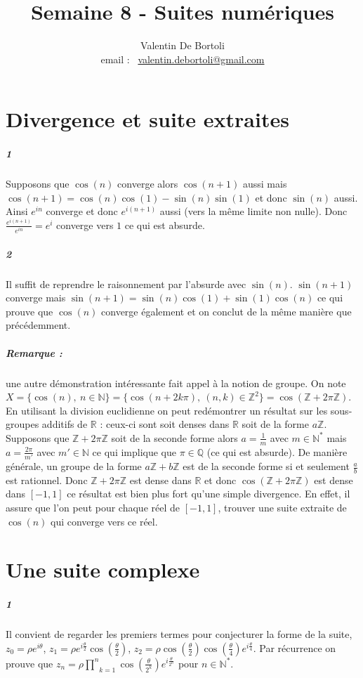 \documentclass[10pt,a4paper]{article}
\title{Semaine 8 - Suites numériques}
\author{Valentin De Bortoli \\ email : \ \href{mailto:valentin.debortoli@gmail.com}{valentin.debortoli@gmail.com}}
\date{}
\newcommand{\prodd}[2]{\underset{#1}{\overset{#2}{\prod}}}
\begin{document}
\maketitle
\section{Divergence et suite extraites}

\subparagraph{1}Supposons que $\cos(n)$ converge alors $\cos(n+1)$ aussi mais $\cos(n+1) = \cos(n)\cos(1) - \sin(n)\sin(1)$ et donc $\sin(n)$ aussi. Ainsi $e^{in}$ converge et donc $e^{i(n+1)}$ aussi (vers la même limite non nulle). Donc $\frac{e^{i(n+1)}}{e^{in}} = e^i$ converge vers $1$ ce qui est absurde.

\subparagraph{2}Il suffit de reprendre le raisonnement par l'absurde avec $\sin(n)$. $\sin(n+1)$ converge mais $\sin(n+1) = \sin(n)\cos(1) + \sin(1)\cos(n)$ ce qui prouve que $\cos(n)$ converge également et on conclut de la même manière que précédemment.

\subparagraph{Remarque :} une autre démonstration intéressante fait appel à la notion de groupe. On note $X= \lbrace \cos(n), \ n\in \mathbb{N} \rbrace = \lbrace \cos(n + 2k\pi) , \ (n,k) \in \mathbb{Z}^2 \rbrace = \cos \left( \mathbb{Z} + 2\pi \mathbb{Z} \right)$. En utilisant la division euclidienne on peut redémontrer un résultat sur les sous-groupes additifs de $\mathbb{R}$ : ceux-ci sont soit denses dans $\mathbb{R}$ soit de la forme $a\mathbb{Z}$. Supposons que $ \mathbb{Z} + 2\pi \mathbb{Z}$ soit de la seconde forme alors $a = \frac{1}{m}$ avec $m \in \mathbb{N}^*$ mais $a = \frac{2\pi}{m'}$ avec $m' \in \mathbb{N}$ ce qui implique que $\pi \in \mathbb{Q}$ (ce qui est absurde). De manière générale, un groupe de la forme $a \mathbb{Z} + b \mathbb{Z}$ est de la seconde forme si et seulement $\frac{a}{b}$ est rationnel. Donc $\mathbb{Z}+ 2\pi\mathbb{Z}$ est dense dans $\mathbb{R}$ et donc $\cos \left( \mathbb{Z}+ 2\pi\mathbb{Z} \right)$ est dense dans $[-1,1]$ ce résultat est bien plus fort qu'une simple divergence. En effet, il assure que l'on peut pour chaque réel de $[-1,1]$, trouver une suite extraite de $\cos(n)$ qui converge vers ce réel.
\section{Une suite complexe}

\subparagraph{1}Il convient de regarder les premiers termes pour conjecturer la forme de la suite, $z_0 = \rho e^{i\theta}$, $z_1 = \rho e^{i\frac{\theta}{2}}\cos(\frac{\theta}{2})$, $z_2= \rho \cos(\frac{\theta}{2}) \cos(\frac{\theta}{4}) e^{i\frac{\theta}{4}}$. Par récurrence on prouve que $z_n = \rho \prodd{k=1}{n} \cos\left( \frac{\theta}{2^k} \right)e^{i \frac{\theta}{2^n}}$ pour $n \in \mathbb{N}^*$.
\end{document}
